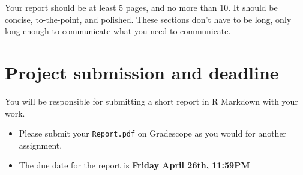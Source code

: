 \documentclass[
]{article}
\providecommand{\tightlist}{%
  \setlength{\itemsep}{0pt}\setlength{\parskip}{0pt}}
\begin{document}
Your report should be at least 5 pages, and no more than 10. It should
be concise, to-the-point, and polished. These sections don't have to be
long, only long enough to communicate what you need to communicate.

\hypertarget{project-submission-and-deadline}{%
\section{Project submission and
deadline}\label{project-submission-and-deadline}}

You will be responsible for submitting a short report in R Markdown with
your work.

\begin{itemize}
\tightlist
\item
  Please submit your \texttt{Report.pdf} on Gradescope as you would for
  another assignment.
\item
  The due date for the report is \textbf{Friday April 26th, 11:59PM}
\end{itemize}
\end{document}
